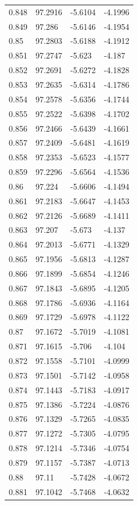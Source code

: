 \begin{tabular}{llll}
0.848 & 97.2916 & -5.6104 & -4.1996 \\
0.849 & 97.286 & -5.6146 & -4.1954 \\
0.85 & 97.2803 & -5.6188 & -4.1912 \\
0.851 & 97.2747 & -5.623 & -4.187 \\
0.852 & 97.2691 & -5.6272 & -4.1828 \\
0.853 & 97.2635 & -5.6314 & -4.1786 \\
0.854 & 97.2578 & -5.6356 & -4.1744 \\
0.855 & 97.2522 & -5.6398 & -4.1702 \\
0.856 & 97.2466 & -5.6439 & -4.1661 \\
0.857 & 97.2409 & -5.6481 & -4.1619 \\
0.858 & 97.2353 & -5.6523 & -4.1577 \\
0.859 & 97.2296 & -5.6564 & -4.1536 \\
0.86 & 97.224 & -5.6606 & -4.1494 \\
0.861 & 97.2183 & -5.6647 & -4.1453 \\
0.862 & 97.2126 & -5.6689 & -4.1411 \\
0.863 & 97.207 & -5.673 & -4.137 \\
0.864 & 97.2013 & -5.6771 & -4.1329 \\
0.865 & 97.1956 & -5.6813 & -4.1287 \\
0.866 & 97.1899 & -5.6854 & -4.1246 \\
0.867 & 97.1843 & -5.6895 & -4.1205 \\
0.868 & 97.1786 & -5.6936 & -4.1164 \\
0.869 & 97.1729 & -5.6978 & -4.1122 \\
0.87 & 97.1672 & -5.7019 & -4.1081 \\
0.871 & 97.1615 & -5.706 & -4.104 \\
0.872 & 97.1558 & -5.7101 & -4.0999 \\
0.873 & 97.1501 & -5.7142 & -4.0958 \\
0.874 & 97.1443 & -5.7183 & -4.0917 \\
0.875 & 97.1386 & -5.7224 & -4.0876 \\
0.876 & 97.1329 & -5.7265 & -4.0835 \\
0.877 & 97.1272 & -5.7305 & -4.0795 \\
0.878 & 97.1214 & -5.7346 & -4.0754 \\
0.879 & 97.1157 & -5.7387 & -4.0713 \\
0.88 & 97.11 & -5.7428 & -4.0672 \\
0.881 & 97.1042 & -5.7468 & -4.0632 \\

\end{tabular}
